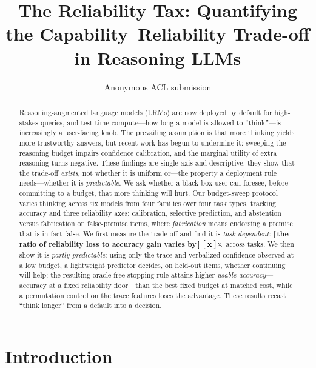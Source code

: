 \documentclass[11pt]{article}
\title{The Reliability Tax: Quantifying the Capability--Reliability Trade-off in Reasoning LLMs}
\author{Anonymous ACL submission}
\newcommand{\PH}[1]{\textbf{[\,#1\,]}}
\begin{document}
\maketitle

\begin{abstract}
Reasoning-augmented language models (LRMs) are now deployed by default for
high-stakes queries, and test-time compute---how long a model is allowed to
``think''---is increasingly a user-facing knob.
The prevailing assumption is that more thinking yields more trustworthy
answers, but recent work has begun to undermine it: sweeping the reasoning
budget impairs confidence calibration, and the marginal utility of extra
reasoning turns negative.
These findings are single-axis and descriptive: they show that
the trade-off \emph{exists}, not whether it is uniform or---the property a
deployment rule needs---whether it is \emph{predictable}.
We ask whether a black-box user can foresee, before committing to a budget,
that more thinking will hurt.
Our budget-sweep protocol varies thinking across six models from four
families over four task types, tracking accuracy and three reliability axes:
calibration, selective prediction, and
abstention versus fabrication on false-premise items, where \emph{fabrication}
means endorsing a premise that is in fact false.
We first measure the trade-off and find it is \emph{task-dependent}:
\PH{the ratio of reliability loss to accuracy gain varies by} $\PH{x}\times$
across tasks.
We then show it is \emph{partly predictable}: using only the trace and
verbalized confidence observed at a low budget, a lightweight predictor
decides, on held-out items, whether continuing will help; the resulting
oracle-free stopping rule attains higher \emph{usable accuracy}---accuracy at
a fixed reliability floor---than the best fixed budget at matched cost, while
a permutation control on the trace features loses the advantage.
These results recast ``think longer'' from a default into a decision.
\end{abstract}

\section{Introduction}
\end{document}
